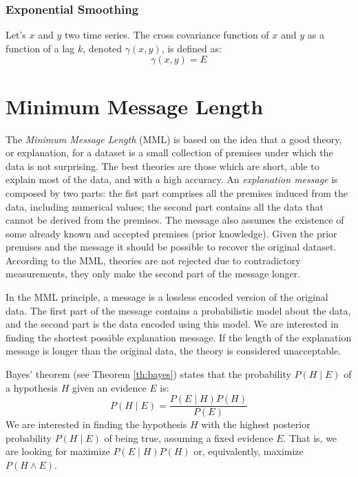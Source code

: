 \subsubsection{Exponential Smoothing}

\begin{definition}
Let's $x$ and $y$ two time series. The cross covariance function of $x$ and $y$ as a function of a lag $k$, denoted $\gamma \left( x, y \right)$, is defined as:
\[
    \gamma \left( x, y \right) = E 
\] 

\end{definition}

\begin{definition}

\end{definition}

%
%
\section{Minimum Message Length}
\label{sec:MML}

The \emph{Minimum Message Length} (MML) is based on the idea that a good theory, or explanation, for a dataset is a small collection of premises under which the data is not surprising. The best theories are those which are short, able to explain most of the data, and with a high accuracy. An \emph{explanation message} is composed by two parts: the fist part comprises all the premises induced from the data, including numerical values; the second part contains all the data that cannot be derived from the premises. The message also assumes the existence of some already known and accepted premises (prior knowledge). Given the prior premises and the message it should be possible to recover the original dataset. According to the MML, theories are not rejected due to contradictory measurements, they only make the second part of the message longer.

In the MML principle, a message is a lossless encoded version of the original data. The first part of the message contains a probabilistic model about the data, and the second part is the data encoded using this model. We are interested in finding the shortest possible explanation message. If the length of the explanation message is longer than the original data, the theory is considered unacceptable.

Bayes' theorem (see Theorem \ref{th:bayes}) states that the probability $P(H \mid E)$ of a hypothesis $H$ given an evidence $E$ is:
\[
    P(H \mid E) = \frac{ P( E \mid H ) P(H) }{ P(E) }
\]
We are interested in finding the hypothesis $H$ with the highest posterior probability $P(H \mid E)$ of being true, assuming a fixed evidence $E$. That is, we are looking for maximize $P( E \mid H ) P(H)$ or, equivalently, maximize $P ( H \wedge E )$.

